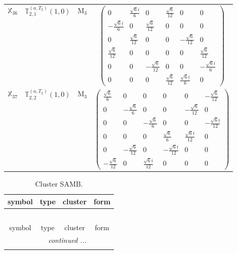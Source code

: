 \documentclass[fleqn,10pt,landscape]{article}
\begin{document}
\begin{itemize}
\begin{center}
\begin{longtable}{c|c|c|c}
$ \mathbb{X}_{36} $ & $\mathbb{T}_{2,1}^{(a,T_{2})}(1,0)$ & M$_{3}$ & $\begin{pmatrix} 0 & \frac{\sqrt{6} i}{6} & 0 & \frac{\sqrt{6}}{12} & 0 & 0 \\ - \frac{\sqrt{6} i}{6} & 0 & \frac{\sqrt{6}}{12} & 0 & 0 & 0 \\ 0 & \frac{\sqrt{6}}{12} & 0 & 0 & - \frac{\sqrt{6}}{12} & 0 \\ \frac{\sqrt{6}}{12} & 0 & 0 & 0 & 0 & \frac{\sqrt{6}}{12} \\ 0 & 0 & - \frac{\sqrt{6}}{12} & 0 & 0 & - \frac{\sqrt{6} i}{6} \\ 0 & 0 & 0 & \frac{\sqrt{6}}{12} & \frac{\sqrt{6} i}{6} & 0 \end{pmatrix}$ \\
$ \mathbb{X}_{37} $ & $\mathbb{T}_{2,2}^{(a,T_{2})}(1,0)$ & M$_{3}$ & $\begin{pmatrix} \frac{\sqrt{6}}{6} & 0 & 0 & 0 & 0 & - \frac{\sqrt{6}}{12} \\ 0 & - \frac{\sqrt{6}}{6} & 0 & 0 & - \frac{\sqrt{6}}{12} & 0 \\ 0 & 0 & - \frac{\sqrt{6}}{6} & 0 & 0 & - \frac{\sqrt{6} i}{12} \\ 0 & 0 & 0 & \frac{\sqrt{6}}{6} & \frac{\sqrt{6} i}{12} & 0 \\ 0 & - \frac{\sqrt{6}}{12} & 0 & - \frac{\sqrt{6} i}{12} & 0 & 0 \\ - \frac{\sqrt{6}}{12} & 0 & \frac{\sqrt{6} i}{12} & 0 & 0 & 0 \end{pmatrix}$ \\
\end{longtable}
\end{center}
\begin{center}
\renewcommand{\arraystretch}{1.3}
\begin{longtable}{c|c|c|c}
\caption{Cluster SAMB.}
 \\
 \hline \hline
symbol & type & cluster & form \\ \hline \endfirsthead

\multicolumn{3}{l}{\tablename\ \thetable{}} \\
 \hline \hline
symbol & type & cluster & form \\ \hline \endhead

 \hline \hline
\multicolumn{3}{r}{\footnotesize\it continued ...} \\ \endfoot


\end{longtable}
\end{center}
\end{itemize}
\end{document}
